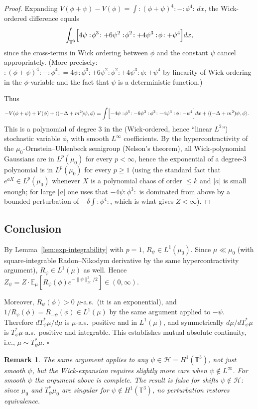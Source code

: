 \documentclass[12pt]{article}
\newtheorem{remark}[theorem]{Remark}
\begin{document}
\begin{proof}
Expanding $V(\phi+\psi) - V(\phi) = \int:\!(\phi+\psi)^4\!: - :\!\phi^4\!:\,dx$, the Wick-ordered difference equals
\[
  \int_{\mathbb{T}^3}\Bigl[4\psi:\!\phi^3\!:
     + 6\psi^2:\!\phi^2\!:
     + 4\psi^3:\!\phi\!:
     + \psi^4\Bigr]dx,
\]
since the cross-terms in Wick ordering between $\phi$ and the constant $\psi$ cancel appropriately.  (More precisely: $:(\phi+\psi)^4: - :\phi^4: = 4\psi:\phi^3: + 6\psi^2:\phi^2: + 4\psi^3:\phi: + \psi^4$ by linearity of Wick ordering in the $\phi$-variable and the fact that $\psi$ is a deterministic function.)

Thus
\begin{align*}
  -V(\phi+\psi)+V(\phi)+\langle(-\Delta+m^2)\psi,\phi\rangle
  &= \int\Bigl[-4\psi:\!\phi^3\!: - 6\psi^2:\!\phi^2\!: - 4\psi^3:\!\phi\!: - \psi^4\Bigr]dx
    + \langle(-\Delta+m^2)\psi,\phi\rangle.
\end{align*}
This is a polynomial of degree 3 in the (Wick-ordered, hence ``linear $L^2$'') stochastic variable $\phi$, with smooth $L^\infty$ coefficients.  By the hypercontractivity of the $\mu_0$-Ornstein--Uhlenbeck semigroup (Nelson's theorem), all Wick-polynomial Gaussians are in $L^p(\mu_0)$ for every $p<\infty$, hence the exponential of a degree-3 polynomial is in $L^p(\mu_0)$ for every $p\geq 1$ (using the standard fact that $e^{aX}\in L^p(\mu_0)$ whenever $X$ is a polynomial chaos of order $\leq k$ and $|a|$ is small enough; for large $|a|$ one uses that $-4\psi:\phi^3:$ is dominated from above by a bounded perturbation of $-\delta\int:\phi^4:$, which is what gives $Z<\infty$).
\end{proof}

\subsection*{Conclusion}

By Lemma~\ref{lem:exp-integrability} with $p=1$, $R_\psi \in L^1(\mu_0)$.  Since $\mu \ll \mu_0$ (with square-integrable Radon--Nikodym derivative by the same hypercontractivity argument), $R_\psi \in L^1(\mu)$ as well.  Hence $Z_\psi = Z \cdot \mathbb{E}_\mu[R_\psi(\phi) e^{-\|\psi\|_{\mathcal{H}}^2/2}] \in (0,\infty)$.

Moreover, $R_\psi(\phi) > 0$ $\mu$-a.s.\ (it is an exponential), and $1/R_\psi(\phi) = R_{-\psi}(\phi) \in L^1(\mu)$ by the same argument applied to $-\psi$.  Therefore $dT_\psi^*\mu/d\mu$ is $\mu$-a.s.\ positive and in $L^1(\mu)$, and symmetrically $d\mu/dT_\psi^*\mu$ is $T_\psi^*\mu$-a.s.\ positive and integrable.  This establishes mutual absolute continuity, i.e., $\mu \sim T_\psi^*\mu$. \hfill$\square$

\begin{remark}
The same argument applies to any $\psi \in \mathcal{H} = H^1(\mathbb{T}^3)$, not just smooth $\psi$, but the Wick-expansion requires slightly more care when $\psi \notin L^\infty$.  For smooth $\psi$ the argument above is complete.  The result is \emph{false} for shifts $\psi \notin \mathcal{H}$: since $\mu_0$ and $T_\psi^*\mu_0$ are singular for $\psi \notin H^1(\mathbb{T}^3)$, no perturbation restores equivalence.
\end{remark}
\end{document}
